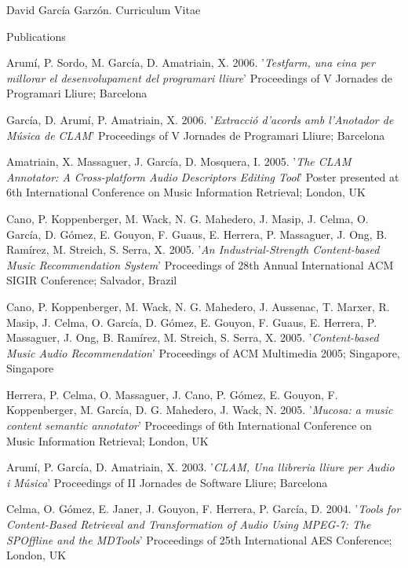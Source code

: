 \documentclass{article}
\begin{document}
\begin{cv}{David García Garzón. Curriculum Vitae}
\begin{cvlist}{Publications}
\item[] {\sc Arumí, P. Sordo, M. García, D. Amatriain, X.} 2006.
'{\em Testfarm, una eina per millorar el desenvolupament del programari lliure}'
Proceedings of V Jornades de Programari Lliure; Barcelona

\item[] {\sc García, D. Arumí, P. Amatriain, X.} 2006.
'{\em Extracció d'acords amb l'Anotador de Música de CLAM}'
Proceedings of V Jornades de Programari Lliure; Barcelona

\item[] {\sc Amatriain, X. Massaguer, J. García, D. Mosquera, I.} 2005.
'{\em The CLAM Annotator: A Cross-platform Audio Descriptors Editing Tool}'
Poster presented at 6th International Conference on Music Information Retrieval; London, UK

\item[] {\sc Cano, P. Koppenberger, M. Wack, N. G. Mahedero, J. Masip, J. Celma, O. García, D. Gómez, E. Gouyon, F. Guaus, E. Herrera, P. Massaguer, J. Ong, B. Ramírez, M. Streich, S. Serra, X.} 2005.
'{\em An Industrial-Strength Content-based Music Recommendation System}'
Proceedings of 28th Annual International ACM SIGIR Conference; Salvador, Brazil

\item[] {\sc Cano, P. Koppenberger, M. Wack, N. G. Mahedero, J. Aussenac, T. Marxer, R. Masip, J. Celma, O. García, D. Gómez, E. Gouyon, F. Guaus, E. Herrera, P. Massaguer, J. Ong, B. Ramírez, M. Streich, S. Serra, X.} 2005.
'{\em Content-based Music Audio Recommendation}'
Proceedings of ACM Multimedia 2005; Singapore, Singapore

\item[] {\sc Herrera, P. Celma, O. Massaguer, J. Cano, P. Gómez, E. Gouyon, F. Koppenberger, M. García, D. G. Mahedero, J. Wack, N.} 2005.
'{\em Mucosa: a music content semantic annotator}'
Proceedings of 6th International Conference on Music Information Retrieval; London, UK

\item[] {\sc Arumí, P. García, D. Amatriain, X.} 2003.
'{\em CLAM, Una llibreria lliure per Audio i Música}'
Proceedings of II Jornades de Software Lliure; Barcelona

\item[] {\sc Celma, O. Gómez, E. Janer, J. Gouyon, F. Herrera, P. García, D.} 2004.
'{\em Tools for Content-Based Retrieval and Transformation of Audio Using MPEG-7: The SPOffline and the MDTools}'
Proceedings of 25th International AES Conference; London, UK


\end{cvlist}
\end{cv}
\end{document}
